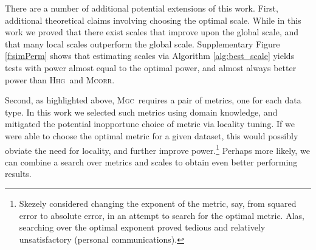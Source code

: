 \documentclass[11pt]{article}
\providecommand{\sct}[1]{{\normalfont\textsc{#1}}}
\newcommand{\Mgc}{\sct{Mgc}}
\newcommand{\Hhg}{\sct{Hhg}}
\newcommand{\Mcorr}{\sct{Mcorr}}
\begin{document}


There are a number of additional potential extensions of this work.  First, additional theoretical claims involving choosing the optimal scale. 
While in this work we proved that there exist scales that improve upon the global scale, and that many local scales outperform the global scale.
Supplementary Figure \ref{f:simPerm} shows that estimating scales via Algorithm \ref{alg:best_scale} yields tests with power almost equal to the optimal power, and almost always better power than \Hhg~and \Mcorr.  



Second, as highlighted above, \Mgc~requires a pair of metrics, one for each data type. In this work we selected such metrics using domain knowledge, and mitigated the potential inopportune choice of metric via locality tuning.  If we were able to choose the optimal metric for a given dataset, this would possibly obviate the need for locality, and further improve power.\footnote{Skezely considered changing the exponent of the metric, say, from squared error to absolute error, in an attempt to search for the optimal metric. Alas, searching over the optimal exponent proved tedious and relatively unsatisfactory (personal communications).  }
Perhaps more likely, we can combine a search over metrics and scales to obtain even better performing results. 
\end{document}
